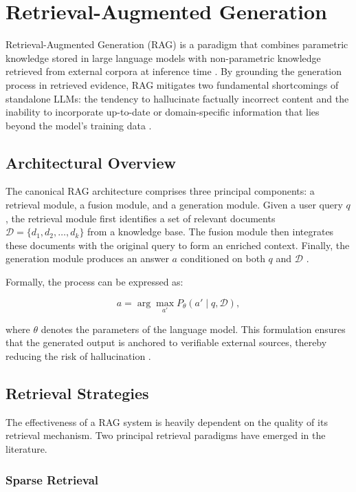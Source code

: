 \section{Retrieval-Augmented Generation}

Retrieval-Augmented Generation (RAG) is a paradigm that combines parametric knowledge stored in large language models with non-parametric knowledge retrieved from external corpora at inference time \cite{lewis2020retrieval}. By grounding the generation process in retrieved evidence, RAG mitigates two fundamental shortcomings of standalone LLMs: the tendency to hallucinate factually incorrect content and the inability to incorporate up-to-date or domain-specific information that lies beyond the model's training data \cite{gao2023retrieval}.

\subsection{Architectural Overview}

The canonical RAG architecture comprises three principal components: a retrieval module, a fusion module, and a generation module. Given a user query \(q\), the retrieval module first identifies a set of relevant documents \(\mathcal{D} = \{d_1, d_2, \dots, d_k\}\) from a knowledge base. The fusion module then integrates these documents with the original query to form an enriched context. Finally, the generation module produces an answer \(a\) conditioned on both \(q\) and \(\mathcal{D}\) \cite{lewis2020retrieval}.

Formally, the process can be expressed as:

\[
a = \arg\max_{a'} P_{\theta}(a' \mid q, \mathcal{D}),
\]

where \(\theta\) denotes the parameters of the language model. This formulation ensures that the generated output is anchored to verifiable external sources, thereby reducing the risk of hallucination \cite{guu2020realm}.

\subsection{Retrieval Strategies}

The effectiveness of a RAG system is heavily dependent on the quality of its retrieval mechanism. Two principal retrieval paradigms have emerged in the literature.

\subsubsection{Sparse Retrieval}

